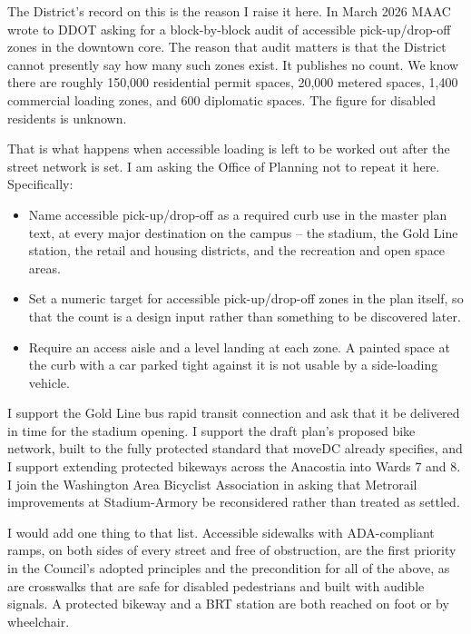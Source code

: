 \documentclass[11pt]{article}
\newcommand{\heading}[1]{\Needspace*{5\baselineskip}\vspace{3mm}{\color{maacnavy}\bfseries\large #1\par}\vspace{-3pt}{\color{rulegrey}\hrule height 0.8pt}\vspace{1mm}\nopagebreak}
\begin{document}
The District's record on this is the reason I raise it here. In March 2026 MAAC
wrote to DDOT asking for a block-by-block audit of accessible pick-up/drop-off
zones in the downtown core. The reason that audit matters is that the District
cannot presently say how many such zones exist. It publishes no count. We know
there are roughly 150,000 residential permit spaces, 20,000 metered spaces,
1,400 commercial loading zones, and 600 diplomatic spaces. The figure for
disabled residents is unknown.

That is what happens when accessible loading is left to be worked out after the
street network is set. I am asking the Office of Planning not to repeat it
here. Specifically:

\begin{itemize}[leftmargin=6mm, itemsep=2pt, topsep=2pt]
  \item Name accessible pick-up/drop-off as a required curb use in the master
        plan text, at every major destination on the campus -- the stadium, the
        Gold Line station, the retail and housing districts, and the recreation
        and open space areas.
  \item Set a numeric target for accessible pick-up/drop-off zones in the plan
        itself, so that the count is a design input rather than something to be
        discovered later.
  \item Require an access aisle and a level landing at each zone. A painted
        space at the curb with a car parked tight against it is not usable by a
        side-loading vehicle.
\end{itemize}

\heading{What I support}

I support the Gold Line bus rapid transit connection and ask that it be
delivered in time for the stadium opening. I support the draft plan's proposed
bike network, built to the fully protected standard that moveDC already
specifies, and I support extending protected bikeways across the Anacostia into
Wards 7 and 8. I join the Washington Area Bicyclist Association in asking that
Metrorail improvements at Stadium-Armory be reconsidered rather than treated as
settled.

I would add one thing to that list. Accessible sidewalks with ADA-compliant
ramps, on both sides of every street and free of obstruction, are the first
priority in the Council's adopted principles and the precondition for all of the above, as are
crosswalks that are safe for disabled pedestrians and built with audible
signals. A protected bikeway and a BRT station are both reached on foot or by
wheelchair.
\end{document}
